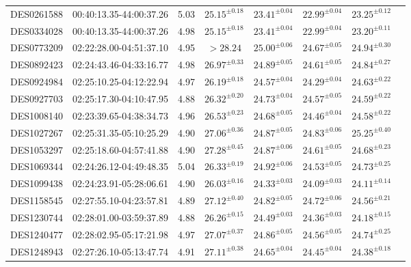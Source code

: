 {\begin{ThreePartTable}
\begin{longtable}{lccccccl}
DES0261588 & 00:40:13.35-44:00:37.26 & 5.03 & $25.15^{ \pm 0.18}$ & $23.41^{ \pm 0.04}$ & $22.99^{ \pm 0.04}$ & $23.25^{ \pm 0.12}$ & \tnote{a} \\
DES0334028 & 00:40:13.35-44:00:37.26 & 4.98 & $25.15^{ \pm 0.18}$ & $23.41^{ \pm 0.04}$ & $22.99^{ \pm 0.04}$ & $23.20^{ \pm 0.11}$ & \tnote{a} \\
DES0773209 & 02:22:28.00-04:51:37.10 & 4.95 & $> 28.24$ & $25.00^{ \pm 0.06}$ & $24.67^{ \pm 0.05}$ & $24.94^{ \pm 0.30}$ & \\
DES0892423 & 02:24:43.46-04:33:16.77 & 4.98 & $26.97^{ \pm 0.33}$ & $24.89^{ \pm 0.05}$ & $24.61^{ \pm 0.05}$ & $24.84^{ \pm 0.27}$ & \\
DES0924984 & 02:25:10.25-04:12:22.94 & 4.97 & $26.19^{ \pm 0.18}$ & $24.57^{ \pm 0.04}$ & $24.29^{ \pm 0.04}$ & $24.63^{ \pm 0.22}$ & \\
DES0927703 & 02:25:17.30-04:10:47.95 & 4.88 & $26.32^{ \pm 0.20}$ & $24.73^{ \pm 0.04}$ & $24.57^{ \pm 0.05}$ & $24.59^{ \pm 0.22}$ & \\
DES1008140 & 02:23:39.65-04:38:34.73 & 4.96 & $26.53^{ \pm 0.23}$ & $24.68^{ \pm 0.05}$ & $24.46^{ \pm 0.04}$ & $24.58^{ \pm 0.22}$ & \\
DES1027267 & 02:25:31.35-05:10:25.29 & 4.90 & $27.06^{ \pm 0.36}$ & $24.87^{ \pm 0.05}$ & $24.83^{ \pm 0.06}$ & $25.25^{ \pm 0.40}$ & \\
DES1053297 & 02:25:18.60-04:57:41.88 & 4.90 & $27.28^{ \pm 0.45}$ & $24.87^{ \pm 0.06}$ & $24.61^{ \pm 0.05}$ & $24.68^{ \pm 0.23}$ & \\
DES1069344 & 02:24:26.12-04:49:48.35 & 5.04 & $26.33^{ \pm 0.19}$ & $24.92^{ \pm 0.06}$ & $24.53^{ \pm 0.05}$ & $24.73^{ \pm 0.25}$ & \\
DES1099438 & 02:24:23.91-05:28:06.61 & 4.90 & $26.03^{ \pm 0.16}$ & $24.33^{ \pm 0.03}$ & $24.09^{ \pm 0.03}$ & $24.11^{ \pm 0.14}$ & \\
DES1158545 & 02:27:55.10-04:23:57.81 & 4.89 & $27.12^{ \pm 0.40}$ & $24.82^{ \pm 0.05}$ & $24.72^{ \pm 0.06}$ & $24.56^{ \pm 0.21}$ & \\
DES1230744 & 02:28:01.00-03:59:37.89 & 4.88 & $26.26^{ \pm 0.15}$ & $24.49^{ \pm 0.03}$ & $24.36^{ \pm 0.03}$ & $24.18^{ \pm 0.15}$ & \\
DES1240477 & 02:28:02.95-05:17:21.98 & 4.97 & $27.07^{ \pm 0.37}$ & $24.86^{ \pm 0.05}$ & $24.56^{ \pm 0.05}$ & $24.74^{ \pm 0.25}$ & \\
DES1248943 & 02:27:26.10-05:13:47.74 & 4.91 & $27.11^{ \pm 0.38}$ & $24.65^{ \pm 0.04}$ & $24.45^{ \pm 0.04}$ & $24.38^{ \pm 0.18}$ & \\

\end{longtable}
\end{ThreePartTable}}
